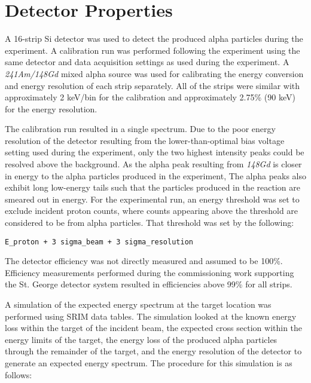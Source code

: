 \section{Detector Properties}\label{detector-properties}

A 16-strip Si detector was used to detect the produced alpha particles
during the experiment. A calibration run was performed following the
experiment using the same detector and data acquisition settings as used
during the experiment. A \emph{241Am/148Gd} mixed alpha source was used
for calibrating the energy conversion and energy resolution of each
strip separately. All of the strips were similar with approximately 2
keV/bin for the calibration and approximately 2.75\% (90 keV) for the
energy resolution.

The calibration run resulted in a single spectrum. Due to the poor
energy resolution of the detector resulting from the lower-than-optimal
bias voltage setting used during the experiment, only the two highest
intensity peaks could be resolved above the background. As the alpha
peak resulting from \emph{148Gd} is closer in energy to the alpha
particles produced in the experiment, The alpha peaks also exhibit long
low-energy tails such that the particles produced in the reaction are
smeared out in energy. For the experimental run, an energy threshold was
set to exclude incident proton counts, where counts appearing above the
threshold are considered to be from alpha particles. That threshold was
set by the following:

\begin{verbatim}
E_proton + 3 sigma_beam + 3 sigma_resolution
\end{verbatim}

The detector efficiency was not directly measured and assumed to be
100\%. Efficiency measurements performed during the commissioning work
supporting the St. George detector system resulted in efficiencies above
99\% for all strips.

A simulation of the expected energy spectrum at the target location was
performed using SRIM data tables. The simulation looked at the known
energy loss within the target of the incident beam, the expected cross
section within the energy limits of the target, the energy loss of the
produced alpha particles through the remainder of the target, and the
energy resolution of the detector to generate an expected energy
spectrum. The procedure for this simulation is as follows:

